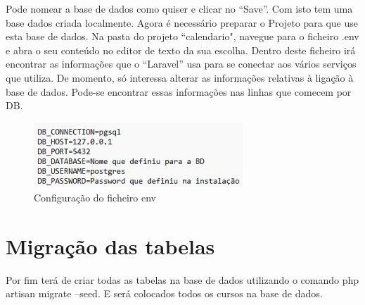 \documentclass[11pt, twoside]{report}
\begin{document}
	Pode nomear a base de dados como quiser e clicar no “Save”. Com isto tem uma base dados 
	criada localmente. Agora é necessário preparar o Projeto para que use esta base de dados. 
	Na pasta do projeto ``calendario", navegue para o ficheiro .env e abra o seu conteúdo no editor 
	de texto da sua escolha. Dentro deste ficheiro irá encontrar as informações que o “Laravel” usa para 
	se conectar aos vários serviços que utiliza. De momento, só interessa alterar as informações 
	relativas à ligação à base de dados. Pode-se encontrar essas informações nas linhas que comecem 
	por DB.
	
	\begin{figure}[H] 
		\centering 
		\includegraphics[width=0.7\textwidth,height=0.7\textheight,keepaspectratio]{images/env}
		\caption{Configuração do ficheiro env}
		\label{env}
	\end{figure}

\section{Migração das tabelas}
Por fim terá de criar todas as tabelas na base de dados utilizando o comando php artisan migrate --seed. E será colocados todos os cursos na base de dados.
\end{document}
